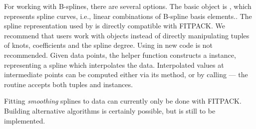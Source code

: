 For working with B-splines, there are several options. The basic object is , which represents spline curves, i.e., linear combinations of B-spline basis elements.\cite{deBoor1978}. The spline
representation used by  is directly compatible with FITPACK. We
recommend that users work with  objects instead of directly
manipulating  tuples of knots, coefficients and the spline degree.
%
Using  in new code is not recommended. Given data points,
the helper function  constructs a 
instance, representing a spline which interpolates the data. Interpolated values
at intermediate points can be computed either via its  method,
or by calling  --- the  routine
accepts both  tuples and  instances.

Fitting \emph{smoothing} splines to data can currently only be done with FITPACK. Building alternative algorithms is certainly possible, but is still to be implemented.

